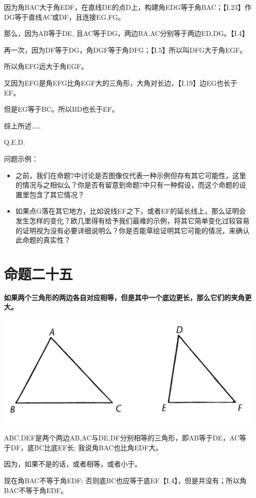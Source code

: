 \documentclass[
]{book}
\providecommand{\tightlist}{%
  \setlength{\itemsep}{0pt}\setlength{\parskip}{0pt}}
\begin{document}
因为角BAC大于角EDF，在直线DE的点D上，构建角EDG等于角BAC；【I.23】作DG等于直线AC或DF，且连接EG,FG。

那么，因为AB等于DE, 且AC等于DG，两边BA,AC分别等于两边ED,DG。【I.4】

再一次，因为DF等于DG，角DGF等于角DFG；【I.5】所以叫DFG大于角EGF。

所以角EFG远大于角EGF。

又因为EFG是角EFG比角EGF大的三角形，大角对长边，【I.19】边EG也长于EF。

但是EG等于BC。所以BD也长于EF。

综上所述\ldots\ldots{}

Q.E.D.

问题示例：

\begin{itemize}
\tightlist
\item
  之前，我们在命题7中讨论是否图像仅代表一种示例但存有其它可能性，这里的情况与之相似么？你是否有留意到命题7中只有一种假设，而这个命题的设置里包含了其它情况？
\item
  如果点G落在其它地方，比如说线EF之下，或者EF的延长线上，那么证明会发生怎样的变化？欧几里得有给予我们最难的示例，将其它简单变化过较容易的证明视为没有必要详细说明么？你是否能草绘证明其它可能的情况，来确认此命题的真实性？
\end{itemize}

\hypertarget{ux547dux9898ux4e8cux5341ux4e94}{%
\section{命题二十五}\label{ux547dux9898ux4e8cux5341ux4e94}}

\textbf{如果两个三角形的两边各自对应相等，但是其中一个底边更长，那么它们的夹角更大。}

\includegraphics[width=0.5\linewidth]{./image/img502}

ABC,DEF是两个两边AB,AC与DE,DF分别相等的三角形，即AB等于DE，AC等于DF，底BC比底EF长; 我说角BAC也比角EDF大。

因为，如果不是的话，或者相等，或者小于。

现在角BAC不等于角EDF; 否则底BC也应等于底EF【I.4】，但是并没有；所以角BAC不等于角EDF。
\end{document}
